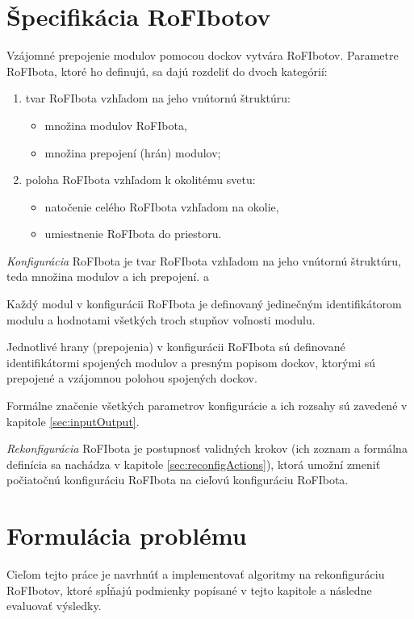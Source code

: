 \documentclass[
  digital, %
  twoside, %
  table,   %
  nolof,     %
  nolot,     %
]{fithesis3}
\begin{document}
\section{Špecifikácia RoFIbotov}
\label{sec:rofibotSec}
Vzájomné prepojenie modulov pomocou dockov vytvára RoFIbotov. Parametre RoFIbota, ktoré ho definujú, sa dajú rozdeliť do dvoch kategórií:   
\begin{enumerate}
    \item tvar RoFIbota vzhľadom na jeho vnútornú štruktúru: 
    \begin{itemize}
        \item množina modulov RoFIbota, 
        \item množina prepojení (hrán) modulov; 
    \end{itemize}
    \item poloha RoFIbota vzhľadom k okolitému svetu: 
    \begin{itemize}
        \item natočenie celého RoFIbota vzhľadom na okolie, 
        \item umiestnenie RoFIbota do priestoru.  
    \end{itemize}
\end{enumerate}

\textit{Konfigurácia} RoFIbota je tvar RoFIbota vzhľadom na jeho vnútornú štruktúru, teda množina modulov a ich prepojení. a

Každý modul v konfigurácii RoFIbota je definovaný jedinečným identifikátorom modulu a hodnotami všetkých troch stupňov voľnosti modulu. 

Jednotlivé hrany (prepojenia) v konfigurácii RoFIbota sú definované identifikátormi spojených modulov a presným popisom dockov, ktorými sú prepojené a vzájomnou polohou spojených dockov. 

Formálne značenie všetkých parametrov konfigurácie a ich rozsahy sú zavedené v kapitole \ref{sec:inputOutput}. 

\textit{Rekonfigurácia} RoFIbota je postupnosť validných krokov (ich zoz\-nam a formálna definícia sa nachádza v kapitole \ref{sec:reconfigActions}), ktorá umožní zmeniť počiatočnú konfiguráciu RoFIbota na cieľovú konfiguráciu RoFIbota. 

\section{Formulácia problému}
\label{sec:restrictions}
Cieľom tejto práce je navrhnúť a implementovať algoritmy na rekonfiguráciu RoFIbotov, ktoré spĺňajú podmienky popísané v tejto kapitole a následne evaluovať výsledky. 
\end{document}
